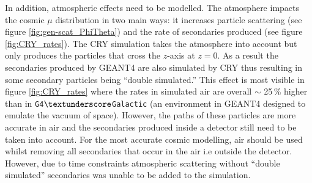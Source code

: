 In addition, atmospheric effects need to be modelled. The atmosphere impacts the cosmic $\mu$ distribution in two main ways: it increases particle scattering (see figure \ref{fig:gen-scat_PhiTheta}) and the rate of secondaries produced (see figure \ref{fig:CRY_rates}). The CRY simulation takes the atmosphere into account \cite{hagmann2007monteCry} but only produces the particles that cross the $z$-axis at $z = 0$. As a result the secondaries produced by GEANT4 are also simulated by CRY thus resulting in some secondary particles being ``double simulated.'' This effect is most visible in figure \ref{fig:CRY_rates} where the rates in simulated air are overall $\sim$ 25\,\% higher than in \texttt{G4$\textunderscore$Galactic} (an environment in GEANT4 designed to emulate the vacuum of space). However, the paths of these particles are more accurate in air and the secondaries produced inside a detector still need to be taken into account. For the most accurate cosmic modelling, air should be used whilst removing all secondaries that occur in the air i.e outside the detector. However, due to time constraints atmospheric scattering without ``double simulated'' secondaries was unable to be added to the simulation. 

